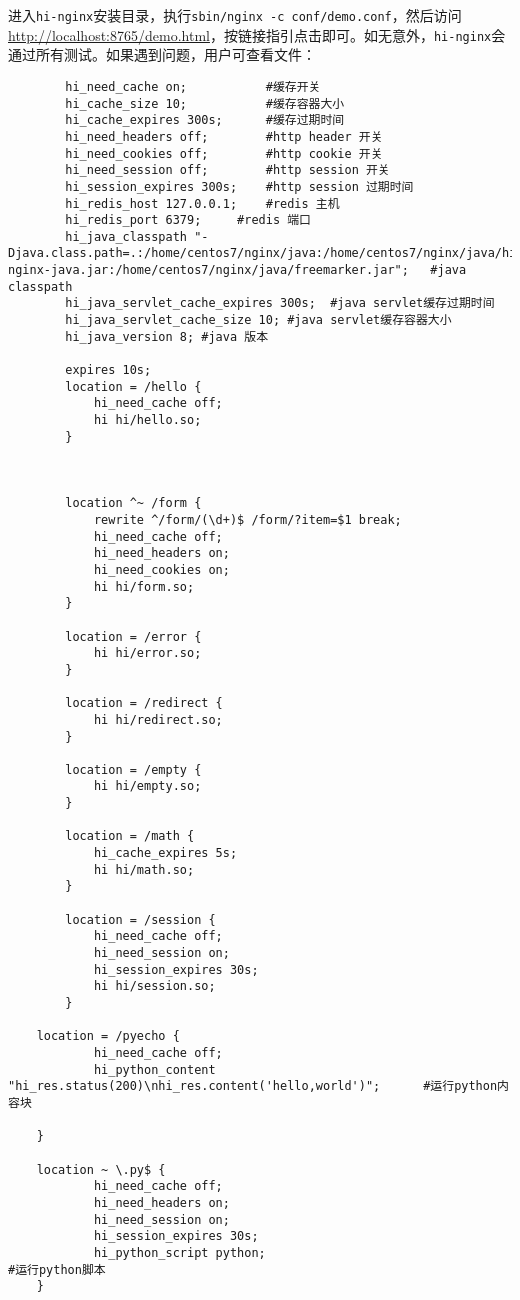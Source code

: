 进入\texttt{hi-nginx}安装目录，执行\texttt{sbin/nginx -c conf/demo.conf}，然后访问\url{http://localhost:8765/demo.html}，按链接指引点击即可。如无意外，\texttt{hi-nginx}会通过所有测试。如果遇到问题，用户可查看文件：
\begin{lstlisting}
        hi_need_cache on;			#缓存开关
        hi_cache_size 10;			#缓存容器大小
        hi_cache_expires 300s;		#缓存过期时间
        hi_need_headers off;		#http header 开关
        hi_need_cookies off;		#http cookie 开关
        hi_need_session off;		#http session 开关
        hi_session_expires 300s;	#http session 过期时间
        hi_redis_host 127.0.0.1;	#redis 主机
        hi_redis_port 6379;		#redis 端口
        hi_java_classpath "-Djava.class.path=.:/home/centos7/nginx/java:/home/centos7/nginx/java/hi-nginx-java.jar:/home/centos7/nginx/java/freemarker.jar";   #java classpath
        hi_java_servlet_cache_expires 300s;  #java servlet缓存过期时间
        hi_java_servlet_cache_size 10; #java servlet缓存容器大小
        hi_java_version 8; #java 版本
        
        expires 10s;
        location = /hello {
            hi_need_cache off;
            hi hi/hello.so;
        }



        location ^~ /form {
            rewrite ^/form/(\d+)$ /form/?item=$1 break;
            hi_need_cache off;
            hi_need_headers on;
            hi_need_cookies on;
            hi hi/form.so;
        }

        location = /error {
            hi hi/error.so;
        }

        location = /redirect {
            hi hi/redirect.so;
        }

        location = /empty {
            hi hi/empty.so;
        }

        location = /math {
            hi_cache_expires 5s;
            hi hi/math.so;
        }
        
        location = /session {
            hi_need_cache off;
            hi_need_session on;
            hi_session_expires 30s;
            hi hi/session.so;
        }

	location = /pyecho {
            hi_need_cache off;
            hi_python_content "hi_res.status(200)\nhi_res.content('hello,world')";		#运行python内容块
	
	}

	location ~ \.py$ {
            hi_need_cache off;
            hi_need_headers on;
            hi_need_session on;
            hi_session_expires 30s;
            hi_python_script python;											#运行python脚本
	}
	

\end{lstlisting}

